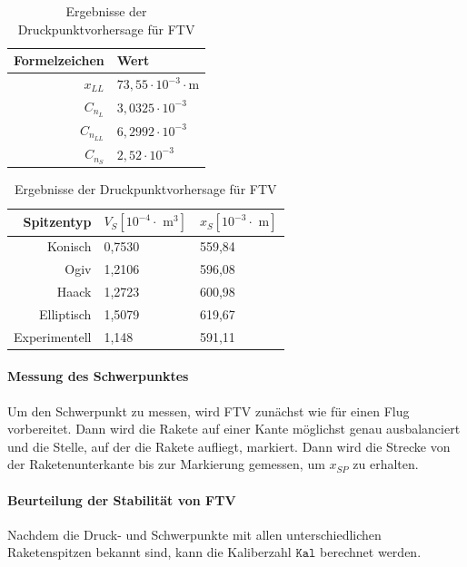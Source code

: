 \documentclass[10pt,a4paper]{article}
\begin{document}
\begin{table}[h]
\caption{Ergebnisse der Druckpunktvorhersage für FTV}
\begin{subtable}[l]{0.49\textwidth}
	\begin{tabular}{r|l}
		\toprule
		Formelzeichen	& Wert	\\
		\midrule
		$x_{LL}$		& $73,55 \cdot 10^{-3} \cdot \text{m}$ \\
		$C_{n_{L}}$		& $3,0325 \cdot 10^{-3}$ \\
		$C_{n_{LL}}$	& $6,2992 \cdot 10^{-3}$ \\
		\midrule
		$C_{n_{S}}$		& $2,52 \cdot 10^{-3}$ \\
		\bottomrule
	\end{tabular}
\end{subtable}
\begin{subtable}[r]{0.49\textwidth}
	\begin{tabular}{r|ll}
	\toprule
	Spitzentyp	& $V_{S} [10^{-4} \cdot \text{ m}^{3}]$ &$x_{S} [10^{-3} \cdot \text{ m}]$  \\
	\midrule
	Konisch		& 0,7530 & 559,84 \\
	Ogiv		& 1,2106 & 596,08 \\
	Haack		& 1,2723 & 600,98 \\
	Elliptisch	& 1,5079 & 619,67 \\
	Experimentell&1,148  & 591,11 \\
	\bottomrule
	\end{tabular}
\label{tab-Position-DP}
\end{subtable}
\end{table}

\paragraph{Messung des Schwerpunktes}
Um den Schwerpunkt zu messen, wird FTV zunächst wie für einen Flug vorbereitet. Dann wird die Rakete auf einer Kante möglichst genau ausbalanciert und die Stelle, auf der die Rakete aufliegt, markiert. Dann wird die Strecke von der Raketenunterkante bis zur Markierung gemessen, um $x_{SP}$ zu erhalten.

\paragraph{Beurteilung der Stabilität von FTV}
Nachdem die Druck- und Schwerpunkte mit allen unterschiedlichen Raketenspitzen bekannt sind, kann die Kaliberzahl $\mathtt{Kal}$ berechnet werden.
\end{document}
